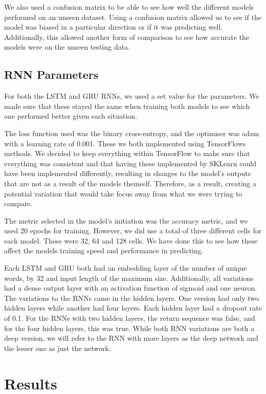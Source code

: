 \documentclass[a4paper,10pt]{article}
\begin{document}
	We also used a confusion matrix to be able to see how well the different models performed on an unseen dataset. Using a confusion matrix allowed us to see if the model was biased in a particular direction or if it was predicting well. Additionally, this allowed another form of comparison to see how accurate the models were on the unseen testing data.
	
	

\subsection{RNN Parameters}
	For both the LSTM and GRU RNNs, we used a set value for the parameters. We made sure that these stayed the same when training both models to see which one performed better given each situation. 
	
	The loss function used was the binary cross-entropy, and the optimiser was adam with a learning rate of 0.001. These we both implemented using TensorFlows methods. We decided to keep everything within TensorFlow to make sure that everything was consistent and that having these implemented by SKLearn could have been implemented differently, resulting in changes to the model's outputs that are not as a result of the models themself. Therefore, as a result, creating a potential variation that would take focus away from what we were trying to compare.
	
	The metric selected in the model's initiation was the accuracy metric, and we used 20 epochs for training. However, we did use a total of three different cells for each model. These were 32, 64 and 128 cells. We have done this to see how these affect the models training speed and performance in predicting.  
	
	Each LSTM and GRU both had an embedding layer of the number of unique words, by 32 and input length of the maximum size. Additionally, all variations had a dense output layer with an activation function of sigmoid and one neuron. The variations to the RNNs came in the hidden layers. One version had only two hidden layers while another had four layers. Each hidden layer had a dropout rate of 0.1. For the RNNs with two hidden layers, the return sequence was false, and for the four hidden layers, this was true. While both RNN variations are both a deep version, we will refer to the RNN with more layers as the deep network and the lesser one as just the network.
	

\section{Results}
	
\end{document}
